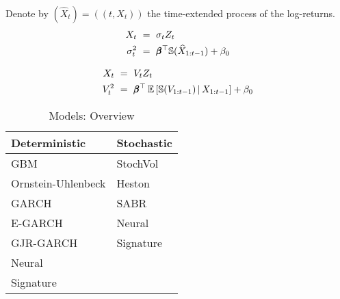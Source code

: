 Denote by $(\widehat{X}_t) = ((t, X_t))$ the time-extended process of the log-returns.
\begin{align*}
X_t ~ &= ~ \sigma_t Z_t \\
\sigma_t^2 ~ &= ~ \pmb{\beta}^\top \mathbb{S}(\widehat{X}_{1:t-1}) + \beta_0
\end{align*}

\begin{align*}
X_t ~&= ~ V_t Z_t \\
V_t^2 ~ &= ~ \pmb{\beta}^\top \operatorname{\mathbb{E}} \left[ \mathbb{S}(V_{1:t-1}) \,|\, X_{1:t-1} \right] + \beta_0
\end{align*}



\begin{table}[]
\caption{Models: Overview}
\begin{tabular}{|l|l|}
\hline
\textbf{Deterministic} & \textbf{Stochastic} \\ \hline
GBM                    & StochVol            \\ \hline
Ornstein-Uhlenbeck     & Heston              \\ \hline
GARCH                  & SABR                \\ \hline
E-GARCH                & Neural              \\ \hline
GJR-GARCH              & Signature           \\ \hline
Neural                 &                     \\ \hline
Signature              &                     \\ \hline
\end{tabular}
\end{table}


